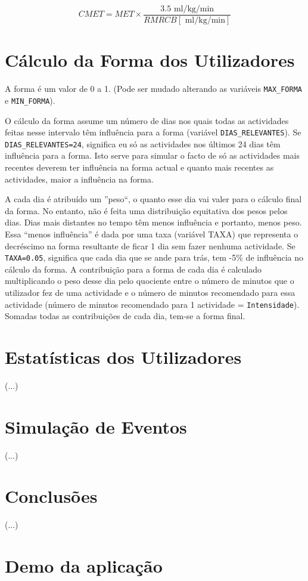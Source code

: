 \documentclass[a4paper,10pt]{report}
\begin{document}
\begin{equation} \label{eq:CMET} 
CMET = MET \times \frac{3.5 \text{ ml/kg/min}}{RMRCB [\text{ ml/kg/min}]}
\end{equation}

\chapter{Cálculo da Forma dos Utilizadores}
\label{cap:forma}
A forma é um valor de 0 a 1. (Pode ser mudado alterando as variáveis \verb!MAX_FORMA! e \verb!MIN_FORMA!).

O cálculo da forma assume um número de dias nos quais todas as actividades feitas nesse intervalo têm influência para a forma 
(variável \verb!DIAS_RELEVANTES!). Se \verb!DIAS_RELEVANTES=24!, significa eu só as actividades nos últimos 24 dias têm influência para a forma.  
Isto serve para simular o facto de só as actividades mais recentes deverem ter influência na forma actual e quanto mais recentes as 
actividades, maior a influência na forma.

A cada dia é atribuído um ''peso``, o quanto esse dia vai valer para o cálculo final da forma. 
No entanto, não é feita uma distribuição equitativa dos pesos pelos dias. Dias mais distantes no tempo têm menos influência e portanto, 
menos peso. Essa “menos influência” é dada por uma taxa (variável TAXA) que representa o decréscimo na forma resultante de ficar 1 dia sem 
fazer nenhuma actividade. Se \verb!TAXA=0.05!, significa que cada dia que se ande para trás, tem -5\% de influência no cálculo da forma.
A contribuição para a forma de cada dia é calculado multiplicando o peso desse dia pelo quociente entre o número de minutos que o utilizador 
fez de uma actividade e o número de minutos recomendado para essa actividade (número de minutos recomendado para 1 actividade = \verb!Intensidade!). 
Somadas todas as contribuições de cada dia, tem-se a forma final.

\chapter{Estatísticas dos Utilizadores}
\label{cap:estatisticas}
(...)

\chapter{Simulação de Eventos}
\label{cap:simula}
(...)

\chapter{Conclusões}
\label{cap:concl}
(...)




\appendix
\chapter{Demo da aplicação}
\label{anex:demo}
\end{document}
